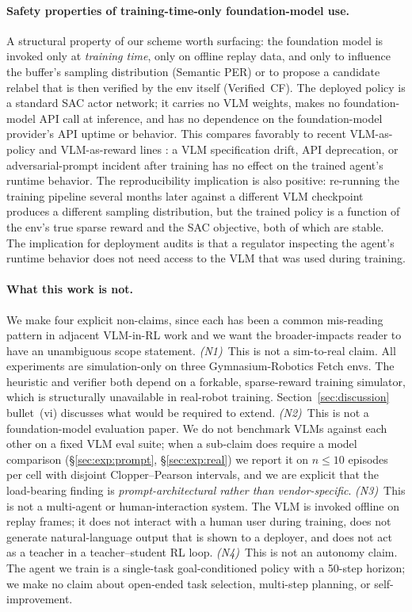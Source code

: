 \paragraph{Safety properties of training-time-only foundation-model
use.}
A structural property of our scheme worth surfacing: the foundation
model is invoked only at \emph{training time}, only on offline replay
data, and only to influence the buffer's sampling distribution (Semantic
PER) or to propose a candidate relabel that is then verified by the env
itself (Verified~CF). The deployed policy is a standard SAC actor
network; it carries no VLM weights, makes no foundation-model API
call at inference, and has no dependence on the foundation-model
provider's API uptime or behavior. This compares favorably to recent
VLM-as-policy and VLM-as-reward lines
\citep{rocamonde2024vlmreward,wu2026largerewardmodels}: a VLM
specification drift, API deprecation, or adversarial-prompt incident
after training has no effect on the trained agent's runtime behavior.
The reproducibility implication is also positive: re-running the
training pipeline several months later against a different VLM
checkpoint produces a different sampling distribution, but the
trained policy is a function of the env's true sparse reward and the
SAC objective, both of which are stable. The implication for
deployment audits is that a regulator inspecting the agent's runtime
behavior does not need access to the VLM that was used during
training.

\paragraph{What this work is not.}
We make four explicit non-claims, since each has been a common
mis-reading pattern in adjacent VLM-in-RL work and we want the
broader-impacts reader to have an unambiguous scope statement.
\emph{(N1)}~This is not a sim-to-real claim. All experiments are
simulation-only on three Gymnasium-Robotics Fetch envs. The
heuristic and verifier both depend on a forkable, sparse-reward
training simulator, which is structurally unavailable in real-robot
training. Section~\ref{sec:discussion} bullet~(vi) discusses what
would be required to extend.
\emph{(N2)}~This is not a foundation-model evaluation paper. We do
not benchmark VLMs against each other on a fixed VLM eval suite;
when a sub-claim does require a model comparison
(\S\ref{sec:exp:prompt}, \S\ref{sec:exp:real}) we report it on
$n\!\le\!10$ episodes per cell with disjoint Clopper--Pearson
intervals, and we are explicit that the load-bearing finding is
\emph{prompt-architectural rather than vendor-specific}.
\emph{(N3)}~This is not a multi-agent or human-interaction system.
The VLM is invoked offline on replay frames; it does not interact
with a human user during training, does not generate natural-language
output that is shown to a deployer, and does not act as a teacher
in a teacher--student RL loop.
\emph{(N4)}~This is not an autonomy claim. The agent we train is a
single-task goal-conditioned policy with a 50-step horizon; we make
no claim about open-ended task selection, multi-step planning, or
self-improvement.

